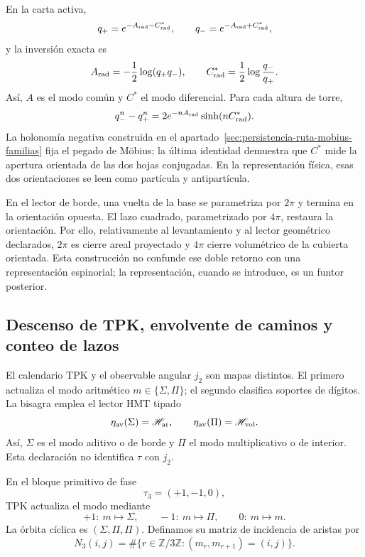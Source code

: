 En la carta activa,
\[
 q_+=e^{-A_{\rm rad}-C^*_{\rm rad}},\qquad
 q_-=e^{-A_{\rm rad}+C^*_{\rm rad}},
\]
y la inversión exacta es
\[
 A_{\rm rad}=-\frac12\log(q_+q_-),
 \qquad
 C^*_{\rm rad}=\frac12\log\frac{q_-}{q_+}.
\]
Así, \(A\) es el modo común y \(C^*\) el modo diferencial. Para cada
altura de torre,
\[
 q_-^n-q_+^n
 =2e^{-nA_{\rm rad}}\sinh(nC^*_{\rm rad}).
\]
La holonomía negativa construida en el
apartado~\ref{sec:persistencia-ruta-mobius-familias} fija el pegado
de Möbius; la última identidad demuestra que \(C^*\) mide la apertura
orientada de las dos hojas conjugadas. En la representación física, esas dos
orientaciones se leen como partícula y antipartícula.

En el lector de borde, una vuelta de la base se parametriza por \(2\pi\) y
termina en la orientación opuesta. El lazo cuadrado, parametrizado por
\(4\pi\), restaura la orientación. Por ello, relativamente al levantamiento y al
lector geométrico declarados, \(2\pi\) es cierre areal proyectado y
\(4\pi\) cierre volumétrico de la cubierta orientada. Esta construcción no
confunde ese doble retorno con una representación espinorial; la
representación, cuando se introduce, es un funtor posterior.

\subsection{Descenso de TPK, envolvente de caminos y conteo de lazos}

El calendario TPK y el observable angular \(j_2\) son mapas distintos. El
primero actualiza el modo aritmético
\(m\in\{\Sigma,\Pi\}\); el segundo clasifica soportes de dígitos. La
bisagra emplea el lector HMT tipado
\[
 \eta_{\rm av}(\Sigma)=\mathscr H_{\rm ar},
 \qquad
 \eta_{\rm av}(\Pi)=\mathscr H_{\rm vol}.
\]
Así, \(\Sigma\) es el modo aditivo o de borde y \(\Pi\) el modo
multiplicativo o de interior. Esta declaración no identifica
\(\tau\) con \(j_2\).

En el bloque primitivo de fase
\[
 \tau_3=(+1,-1,0),
\]
TPK actualiza el modo mediante
\[
 +1:\ m\mapsto\Sigma,\qquad
 -1:\ m\mapsto\Pi,\qquad
 0:\ m\mapsto m.
\]
La órbita cíclica es \((\Sigma,\Pi,\Pi)\). Definamos su matriz de
incidencia de aristas por
\[
 N_3(i,j)=
 \#\{r\in\mathbb Z/3\mathbb Z:(m_r,m_{r+1})=(i,j)\}.
\]

